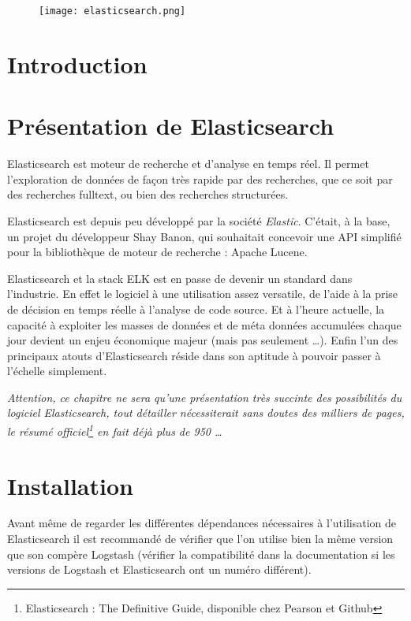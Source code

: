 
\begin{figure}[H]
\center
\texttt{[image: elasticsearch.png]}
\label{fig:elasticsearchlogo.png}
\end{figure}
\section{Introduction}

\section{Présentation de Elasticsearch}
Elasticsearch est moteur de recherche et d'analyse en temps réel. Il permet l'exploration
de données de façon très rapide par des recherches, que ce soit par des recherches
\gls{fulltext}, ou bien des recherches structurées.

Elasticsearch est depuis peu développé par la société \emph{Elastic}. C'était, à 
la base, un projet du développeur Shay Banon, qui souhaitait concevoir une API simplifié
pour la bibliothèque de moteur de recherche : Apache Lucene.

Elasticsearch et la stack ELK est en passe de devenir un standard dans l'industrie.
En effet le logiciel à une utilisation assez versatile, de l'aide à la prise de 
décision en temps réelle à l'analyse de code source. Et à l'heure actuelle, la capacité 
à exploiter les masses de données et de méta données accumulées chaque jour devient 
un enjeu économique majeur (mais pas seulement \ldots). Enfin l'un des principaux 
atouts d'Elasticsearch réside dans son aptitude à pouvoir passer à l'échelle simplement.

\footnotesize{\emph{Attention, ce chapitre ne sera qu'une présentation très succinte des possibilités 
du logiciel Elasticsearch, tout détailler nécessiterait \emph{sans doutes} des milliers
de pages, le résumé officiel\footnote{Elasticsearch : The Definitive Guide, disponible 
chez Pearson et Github}
en fait déjà \emph{plus de 950} \ldots}}

\section{Installation}
Avant même de regarder les différentes dépendances nécessaires à l'utilisation de
Elasticsearch il est recommandé de vérifier que l'on utilise bien la même version
que son compère Logstash (vérifier la compatibilité dans la documentation si les
versions de Logstash et Elasticsearch ont un numéro différent).

